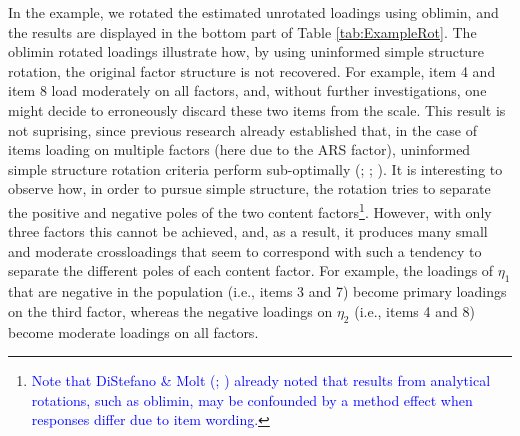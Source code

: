 \documentclass[a4paper,man,natbib]{apa6}
\begin{document}
\begin{linenumbers}
In the example, we rotated the estimated unrotated loadings using oblimin, and the results are displayed in the bottom part of Table \ref{tab:ExampleRot}. The oblimin rotated loadings illustrate how, by using uninformed simple structure rotation, the original factor structure is not recovered. For example, item 4 and item 8 load moderately on all factors, and, without further investigations, one might decide to erroneously discard these two items from the scale.\label{refpage:R1Mj2c} This result is not suprising, since previous research already established that, in the case of items loading on multiple factors (here due to the ARS factor), uninformed simple structure rotation criteria perform sub-optimally (\citealp{lorenzo1999promin}; \citealp{ferrando2000unrestricted}; \citealp{schmitt2011rotation}). It is interesting to observe how, in order to pursue simple structure, the rotation tries to separate the positive and negative poles of the two content factors\label{refpage:R2Mi1a}\footnote{\textcolor{blue}{Note that DiStefano \& Molt (\citeyear{distefano2006further}; \citeyear{distefano2009self}) already noted that results from analytical rotations, such as oblimin, may be confounded by a method effect when responses differ due to item wording.}}. However, with only three factors this cannot be achieved, and, as a result, it produces many small and moderate crossloadings that seem to correspond with such a tendency to separate the different poles of each content factor. For example, the loadings of $\eta_{1}$ that are negative in the population (i.e., items 3 and 7) become primary loadings on the third factor, whereas the negative loadings on $\eta_{2}$ (i.e., items 4 and 8) become moderate loadings on all factors.










\end{linenumbers}
\end{document}
